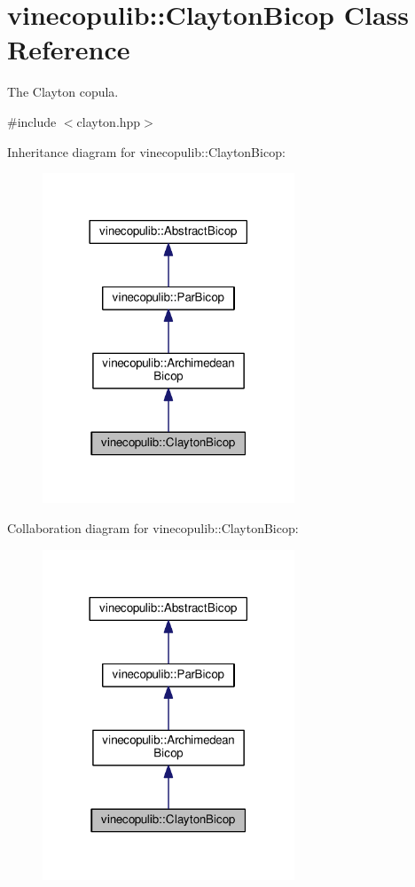 \hypertarget{classvinecopulib_1_1_clayton_bicop}{}\section{vinecopulib\+:\+:Clayton\+Bicop Class Reference}
\label{classvinecopulib_1_1_clayton_bicop}


The Clayton copula.  




{\ttfamily \#include $<$clayton.\+hpp$>$}



Inheritance diagram for vinecopulib\+:\+:Clayton\+Bicop\+:
\nopagebreak
\begin{figure}[H]
\begin{center}
\leavevmode
\includegraphics[width=213pt]{classvinecopulib_1_1_clayton_bicop__inherit__graph}
\end{center}
\end{figure}


Collaboration diagram for vinecopulib\+:\+:Clayton\+Bicop\+:
\nopagebreak
\begin{figure}[H]
\begin{center}
\leavevmode
\includegraphics[width=213pt]{classvinecopulib_1_1_clayton_bicop__coll__graph}
\end{center}
\end{figure}
